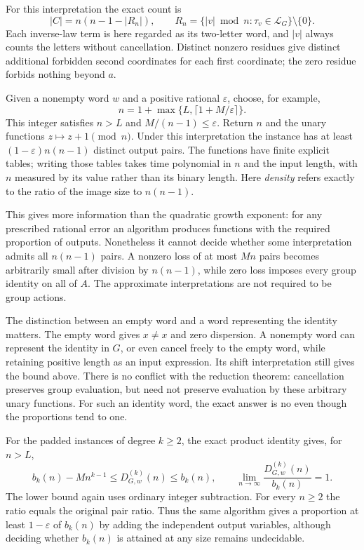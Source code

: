 \documentclass[12pt]{article}
\theoremstyle{definition}
\begin{document}
For this interpretation the exact count is
\[
 |C|=n(n-1-|R_n|),\qquad
 R_n=\{|v|\bmod n:\tau_v\in\mathcal L_G\}\setminus\{0\}.
\]
Each inverse-law term is here regarded as its two-letter word, and
$|v|$ always counts the letters without cancellation. Distinct nonzero
residues give distinct additional forbidden second coordinates for
each first coordinate; the zero residue forbids nothing beyond $a$.

Given a nonempty word $w$ and a positive rational $\varepsilon$, choose,
for example,
\[
 n=1+\max\{L,\lceil1+M/\varepsilon\rceil\}.
\]
This integer satisfies $n>L$ and $M/(n-1)\le\varepsilon$.
Return $n$ and the unary functions $z\mapsto z+1\pmod n$.
Under this interpretation the instance has at least
$(1-\varepsilon)n(n-1)$ distinct output pairs.
The functions have finite explicit tables; writing those tables takes
time polynomial in $n$ and the input length, with $n$ measured by its
value rather than its binary length. Here \emph{density} refers exactly
to the ratio of the image size to $n(n-1)$.

This gives more information than the quadratic growth exponent:
for any prescribed rational error an algorithm produces functions with
the required proportion of outputs. Nonetheless it cannot decide
whether some interpretation admits all $n(n-1)$ pairs. A nonzero loss
of at most $Mn$ pairs becomes arbitrarily small after division by
$n(n-1)$, while zero loss imposes every group identity on all of $A$.
The approximate interpretations are not required to be group actions.

The distinction between an empty word and a word representing the
identity matters. The empty word gives $x\ne x$ and zero dispersion.
A nonempty word can represent the identity in $G$, or even cancel
freely to the empty word, while retaining positive length as an input
expression. Its shift interpretation still gives the bound above.
There is no conflict with the reduction theorem: cancellation preserves
group evaluation, but need not preserve evaluation by these arbitrary
unary functions. For such an identity word, the exact answer is no
even though the proportions tend to one.

For the padded instances of degree $k\ge2$, the exact product identity
gives, for $n>L$,
\[
 b_k(n)-Mn^{k-1}\le D_{G,w}^{(k)}(n)\le b_k(n),
 \qquad
 \lim_{n\to\infty}\frac{D_{G,w}^{(k)}(n)}{b_k(n)}=1.
\]
The lower bound again uses ordinary integer subtraction. For every
$n\ge2$ the ratio equals the original pair ratio. Thus the same
algorithm gives a proportion at least $1-\varepsilon$ of $b_k(n)$
by adding the independent output variables, although deciding whether
$b_k(n)$ is attained at any size remains undecidable.
\end{document}
